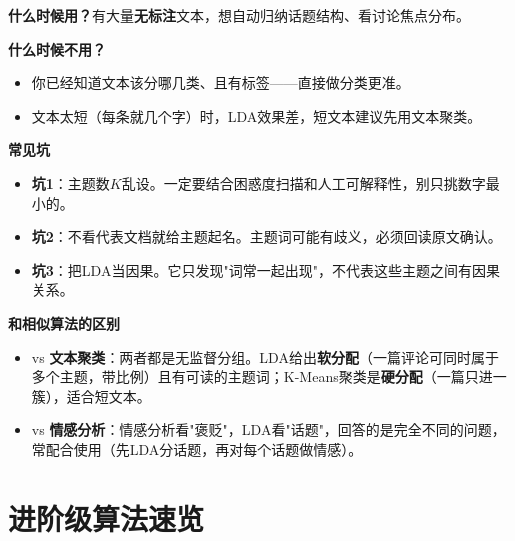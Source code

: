 \begin{algonotes}
\textbf{什么时候用？}有大量\textbf{无标注}文本，想自动归纳话题结构、看讨论焦点分布。

\textbf{什么时候不用？}
\begin{itemize}
    \item 你已经知道文本该分哪几类、且有标签——直接做分类更准。
    \item 文本太短（每条就几个字）时，LDA效果差，短文本建议先用文本聚类。
\end{itemize}

\textbf{常见坑}
\begin{itemize}
    \item \textbf{坑1}：主题数$K$乱设。一定要结合困惑度扫描和人工可解释性，别只挑数字最小的。
    \item \textbf{坑2}：不看代表文档就给主题起名。主题词可能有歧义，必须回读原文确认。
    \item \textbf{坑3}：把LDA当因果。它只发现"词常一起出现"，不代表这些主题之间有因果关系。
\end{itemize}

\textbf{和相似算法的区别}
\begin{itemize}
    \item vs \textbf{文本聚类}：两者都是无监督分组。LDA给出\textbf{软分配}（一篇评论可同时属于多个主题，带比例）且有可读的主题词；K-Means聚类是\textbf{硬分配}（一篇只进一簇），适合短文本。
    \item vs \textbf{情感分析}：情感分析看"褒贬"，LDA看"话题"，回答的是完全不同的问题，常配合使用（先LDA分话题，再对每个话题做情感）。
\end{itemize}
\end{algonotes}

\section{进阶级算法速览}


